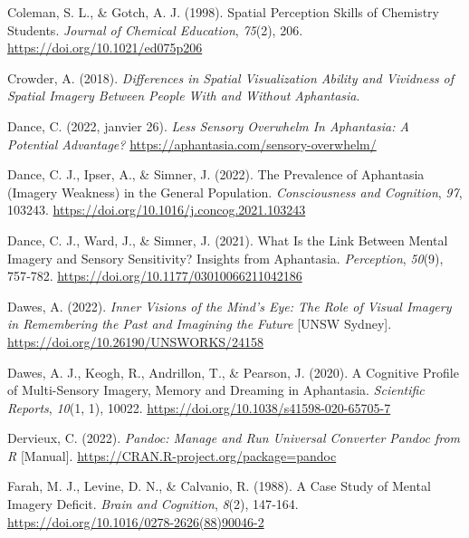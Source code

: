 \documentclass[
  12pt,
]{article}
\newlength{\cslhangindent}
\newlength{\cslentryspacingunit} %
\newenvironment{CSLReferences}[2] %
 {%
  \setlength{\parindent}{0pt}
  \ifodd #1
  \let\oldpar\par
  \def\par{\hangindent=\cslhangindent\oldpar}
  \fi
  \setlength{\parskip}{#2\cslentryspacingunit}
 }%
 {}
\begin{document}
\begin{CSLReferences}{1}{0}
\leavevmode{}%
Coleman, S. L., \& Gotch, A. J. (1998). Spatial {Perception Skills} of
{Chemistry Students}. \emph{Journal of Chemical Education},
\emph{75}(2), 206. \url{https://doi.org/10.1021/ed075p206}

\leavevmode{}%
Crowder, A. (2018). \emph{Differences in {Spatial Visualization Ability}
and {Vividness} of {Spatial Imagery Between People With} and {Without
Aphantasia}}.

\leavevmode{}%
Dance, C. (2022, janvier 26). \emph{Less {Sensory Overwhelm In
Aphantasia}: {A Potential Advantage}?}
\url{https://aphantasia.com/sensory-overwhelm/}

\leavevmode{}%
Dance, C. J., Ipser, A., \& Simner, J. (2022). The Prevalence of
Aphantasia (Imagery Weakness) in the General Population.
\emph{Consciousness and Cognition}, \emph{97}, 103243.
\url{https://doi.org/10.1016/j.concog.2021.103243}

\leavevmode{}%
Dance, C. J., Ward, J., \& Simner, J. (2021). What Is the {Link Between
Mental Imagery} and {Sensory Sensitivity}? {Insights} from {Aphantasia}.
\emph{Perception}, \emph{50}(9), 757‑782.
\url{https://doi.org/10.1177/03010066211042186}

\leavevmode{}%
Dawes, A. (2022). \emph{Inner Visions of the Mind's Eye: {The} Role of
Visual Imagery in Remembering the Past and Imagining the Future}
{[}{UNSW Sydney}{]}. \url{https://doi.org/10.26190/UNSWORKS/24158}

\leavevmode{}%
Dawes, A. J., Keogh, R., Andrillon, T., \& Pearson, J. (2020). A
Cognitive Profile of Multi-Sensory Imagery, Memory and Dreaming in
Aphantasia. \emph{Scientific Reports}, \emph{10}(1, 1), 10022.
\url{https://doi.org/10.1038/s41598-020-65705-7}

\leavevmode{}%
Dervieux, C. (2022). \emph{Pandoc: {Manage} and Run Universal Converter
Pandoc from {R}} {[}Manual{]}.
\url{https://CRAN.R-project.org/package=pandoc}

\leavevmode{}%
Farah, M. J., Levine, D. N., \& Calvanio, R. (1988). A Case Study of
Mental Imagery Deficit. \emph{Brain and Cognition}, \emph{8}(2),
147‑164. \url{https://doi.org/10.1016/0278-2626(88)90046-2}


\end{CSLReferences}
\end{document}
